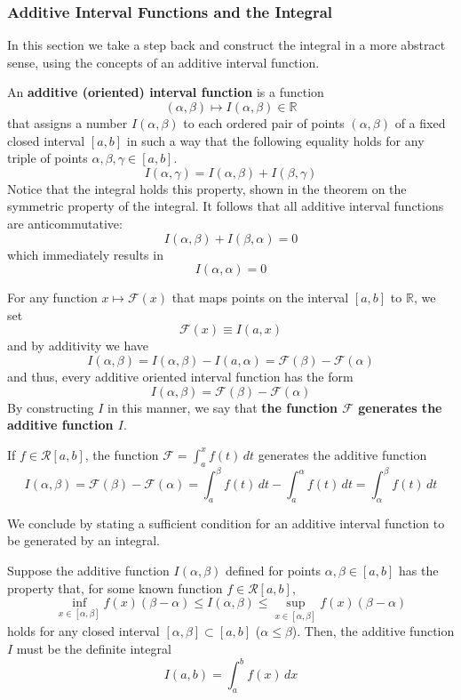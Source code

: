   \subsubsection{Additive Interval Functions and the Integral}
  In this section we take a step back and construct the integral in a more abstract sense, using the concepts of an additive interval function. 

  \begin{definition}
    An \textbf{additive (oriented) interval function} is a function 
    \[(\alpha, \beta) \mapsto I(\alpha, \beta) \in \mathbb{R}\]
    that assigns a number $I(\alpha, \beta)$ to each ordered pair of points $(\alpha, \beta)$ of a fixed closed interval $[a, b]$ in such a way that the following equality holds for any triple of points $\alpha, \beta, \gamma \in [a, b]$. 
    \[I(\alpha, \gamma) = I(\alpha, \beta) + I(\beta, \gamma)\]
    Notice that the integral holds this property, shown in the theorem on the symmetric property of the integral. It follows that all additive interval functions are anticommutative: 
    \[I(\alpha, \beta) + I(\beta, \alpha) = 0\]
    which immediately results in
    \[I(\alpha, \alpha) = 0\]
  \end{definition}

  \begin{lemma}
    For any function $x \mapsto \mathcal{F}(x)$ that maps points on the interval $[a, b]$ to $\mathbb{R}$, we set
    \[\mathcal{F}(x) \equiv I(a, x)\]
    and by additivity we have
    \[I(\alpha, \beta) = I(\alpha, \beta) - I(a, \alpha) = \mathcal{F}(\beta) - \mathcal{F}(\alpha)\]
    and thus, every additive oriented interval function has the form 
    \[I(\alpha, \beta) = \mathcal{F}(\beta) - \mathcal{F}(\alpha)\]
    By constructing $I$ in this manner, we say that \textbf{the function $\mathcal{F}$ generates the additive function $I$}. 
  \end{lemma}

  \begin{example}
  If $f \in \mathcal{R}[a, b]$, the function $\mathcal{F} = \int_a^x f(t)\,dt$ generates the additive function
  \[I(\alpha, \beta) = \mathcal{F}(\beta) - \mathcal{F}(\alpha) = \int_a^\beta f(t)\,dt - \int_a^\alpha f(t)\,dt = \int_\alpha^\beta f(t)\,dt\]
  \end{example}

  We conclude by stating a sufficient condition for an additive interval function to be generated by an integral. 
  \begin{theorem}
  Suppose the additive function $I(\alpha, \beta)$ defined for points $\alpha, \beta \in [a, b]$ has the property that, for some known function $f \in \mathcal{R}[a, b]$, 
  \[\inf_{x \in [\alpha, \beta]} f(x) (\beta - \alpha) \leq I(\alpha, \beta) \leq \sup_{x \in [\alpha, \beta]} f(x) (\beta - \alpha)\]
  holds for any closed interval $[\alpha, \beta] \subset [a, b]$ ($\alpha \leq \beta$). Then, the additive function $I$ must be the definite integral
  \[I(a, b) = \int_a^b f(x)\,dx\]
  \end{theorem}

